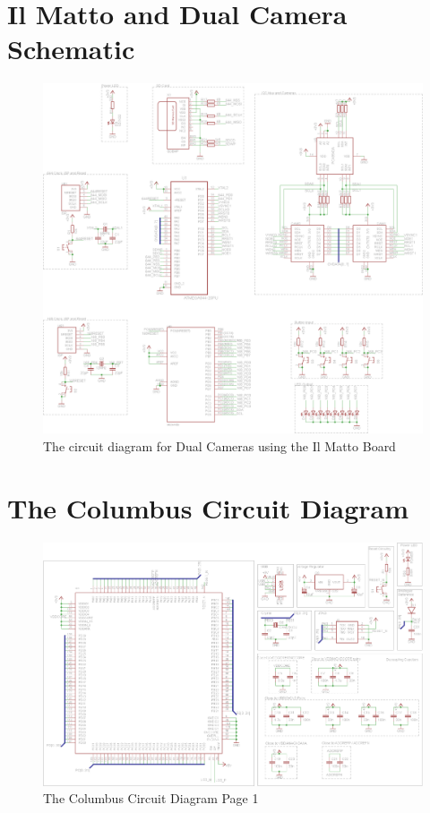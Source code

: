 \section{Il Matto and Dual Camera Schematic}\label{sch:IlMatto:Cameras}
\begin{figure}[ht!]
\centering
\includegraphics[angle = 90, width=\textwidth,height=\textheight,keepaspectratio]{Figures/IlMattoCamera_CircuitDiagram.png} 
\caption{The circuit diagram for Dual Cameras using the Il Matto Board}
\label{sch:DualCam_Schematic}
\end{figure}
\clearpage

\section{The Columbus Circuit Diagram} \label{sch:Columbus:CircuitDiagram}
\begin{figure}[ht!]
\centering
\includegraphics[angle = 90, width=\textwidth,height=\textheight,keepaspectratio]{./Figures/ColumbusCircuitPage1.png}
\caption{The Columbus Circuit Diagram Page 1}
\label{sch:Columbus_Schematic:1}
\end{figure}

